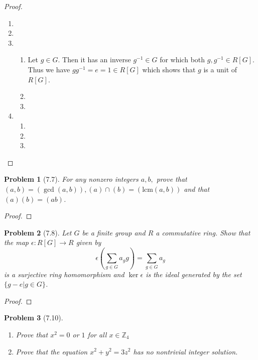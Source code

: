 \documentclass[10pt]{article}
\newcommand{\sk}{\vskip 10mm}
\newcommand{\bb}[1]{\mathbb{#1}}
\theoremstyle{plain}
\newtheorem{problem}{Problem}
\theoremstyle{remark}
\begin{document}
\begin{proof}
  \begin{enumerate}
  \item
  \item
  \item
    \begin{enumerate}
    \item Let $g\in G$. Then it has an inverse $g^{-1}\in G$
      for which both $g,g^{-1}\in R[G]$. Thus we have
      $gg^{-1}=e=1\in R[G]$ which shows that $g$ is a unit of $R[G]$.
    \item
    \item
    \end{enumerate}
  \item
    \begin{enumerate}
    \item
    \item
    \item
    \end{enumerate}
  \end{enumerate}
\end{proof}

\sk

\begin{problem}[7.7]
  For any nonzero integers $a,b,$ prove that
  $(a,b)=(\gcd(a,b)),(a)\cap(b)=(\text{lcm}(a,b))$
  and that $(a)(b)=(ab)$.
\end{problem}

\begin{proof}
  
\end{proof}

\sk

\begin{problem}[7.8]
  Let $G$ be a finite group and $R$ a commutative ring. Show that the map
  $\epsilon:R[G]\rightarrow R$ given by
  \[ \epsilon\left(\sum_{g\in G}a_gg\right)=\sum_{g\in G}a_g \]
  is a surjective ring homomorphism and $\ker \epsilon$ is the ideal generated by
  the set $\{g-e|g\in G\}$.
\end{problem}

\begin{proof}
  
\end{proof}

\sk

\begin{problem}[7.10]
  \begin{enumerate}
  \item Prove that $x^2=0$ or $1$ for all $x\in\bb{Z}_4$
  \item Prove that the equation $x^2+y^2=3z^2$ has no nontrivial
    integer solution.
  \end{enumerate}
\end{problem}
\end{document}
